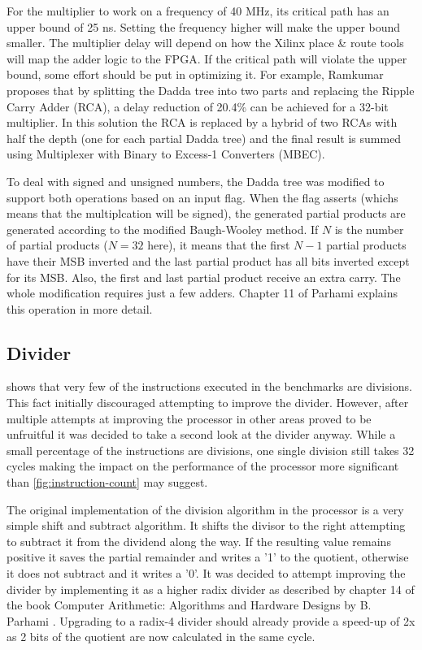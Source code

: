 \documentclass[final]{article}
\begin{document}
For the multiplier to work on a frequency of 40 MHz, its critical path has an upper bound of 25 ns. Setting the frequency higher will make the upper bound smaller. The multiplier delay will depend on how the Xilinx place \& route tools will map the adder logic to the FPGA. If the critical path will violate the upper bound, some effort should be put in optimizing it. For example, Ramkumar \cite{ramkumar} proposes that by splitting the Dadda tree into two parts and replacing the Ripple Carry Adder (RCA), a delay reduction of 20.4\% can be achieved for a 32-bit multiplier. In this solution the RCA is replaced by a hybrid of two RCAs with half the depth (one for each partial Dadda tree) and the final result is summed using Multiplexer with Binary to Excess-1 Converters (MBEC).

To deal with signed and unsigned numbers, the Dadda tree was modified to support both operations based on an input flag. When the flag asserts (whichs means that the multiplcation will be signed), the generated partial products are generated according to the modified Baugh-Wooley method. If $N$ is the number of partial products ($N=32$ here), it means that the first $N-1$ partial products have their MSB inverted and the last partial product has all bits inverted except for its MSB. Also, the first and last partial product receive an extra carry. The whole modification requires just a few adders. Chapter 11 of Parhami \cite{parhami} explains this operation in more detail.

\subsection{Divider}
 shows that very few of the instructions executed in the benchmarks are divisions. This fact initially discouraged attempting to improve the divider. However, after multiple attempts at improving the processor in other areas proved to be unfruitful it was decided to take a second look at the divider anyway. While a small percentage of the instructions are divisions, one single division still takes 32 cycles making the impact on the performance of the processor more significant than \cref{fig:instruction-count} may suggest. 

The original implementation of the division algorithm in the processor is a very simple shift and subtract algorithm. It shifts the divisor to the right attempting to subtract it from the dividend along the way. If the resulting value remains positive it saves the partial remainder and writes a '1' to the quotient, otherwise it does not subtract and it writes a '0'. It was decided to attempt improving the divider by implementing it as a higher radix divider as described by chapter 14 of the book Computer Arithmetic: Algorithms and Hardware Designs by B. Parhami \cite{parhami}. Upgrading to a radix-4 divider should already provide a speed-up of 2x as 2 bits of the quotient are now calculated in the same cycle.
\end{document}
